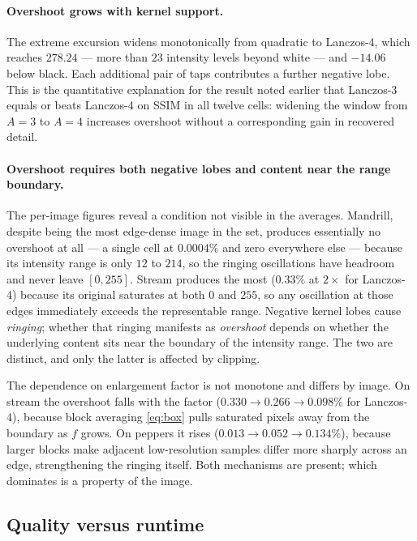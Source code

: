 \documentclass[11pt,a4paper]{article}
\begin{document}
\paragraph{Overshoot grows with kernel support.} The extreme excursion widens monotonically
from quadratic to Lanczos-4, which reaches $278.24$ --- more than $23$ intensity levels beyond
white --- and $-14.06$ below black. Each additional pair of taps contributes a further
negative lobe. This is the quantitative explanation for the result noted earlier that
Lanczos-3 equals or beats Lanczos-4 on SSIM in all twelve cells: widening the window from
$A=3$ to $A=4$ increases overshoot without a corresponding gain in recovered detail.

\paragraph{Overshoot requires both negative lobes and content near the range boundary.} The
per-image figures reveal a condition not visible in the averages. Mandrill, despite being the
most edge-dense image in the set, produces essentially no overshoot at all --- a single cell
at $0.0004\%$ and zero everywhere else --- because its intensity range is only $12$ to $214$,
so the ringing oscillations have headroom and never leave $[0,255]$. Stream produces the most
($0.33\%$ at $2\times$ for Lanczos-4) because its original saturates at both $0$ and $255$, so
any oscillation at those edges immediately exceeds the representable range. Negative kernel
lobes cause \emph{ringing}; whether that ringing manifests as \emph{overshoot} depends on
whether the underlying content sits near the boundary of the intensity range. The two are
distinct, and only the latter is affected by clipping.

The dependence on enlargement factor is not monotone and differs by image. On stream the
overshoot falls with the factor ($0.330 \to 0.266 \to 0.098\%$ for Lanczos-4), because block
averaging \eqref{eq:box} pulls saturated pixels away from the boundary as $f$ grows. On
peppers it rises ($0.013 \to 0.052 \to 0.134\%$), because larger blocks make adjacent
low-resolution samples differ more sharply across an edge, strengthening the ringing itself.
Both mechanisms are present; which dominates is a property of the image.

\subsection{Quality versus runtime}
\end{document}
